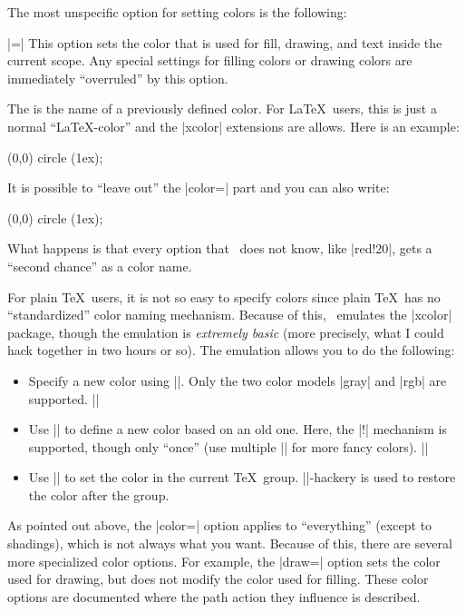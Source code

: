 The most unspecific option for setting colors is the following:

\begin{itemize}
  |=|%
  This option sets the color that is used for fill, drawing, and text
  inside the current scope. Any special settings for filling colors or
  drawing colors are immediately ``overruled'' by this option.

  The  is the name of a previously defined color. For
  \LaTeX\ users, this is just a normal ``\LaTeX-color'' and the
  |xcolor| extensions are allows. Here is an example:

\begin{codeexample}[]
\tikz \fill[color=red!20] (0,0) circle (1ex);
\end{codeexample}

  It is possible to ``leave out'' the |color=| part and you can also
  write:
\begin{codeexample}[]
\tikz \fill[red!20] (0,0) circle (1ex);
\end{codeexample}
  What happens is that every option that \tikzname\ does not know, like
  |red!20|, gets a ``second chance'' as a color name.

  For plain \TeX\ users, it is not so easy to specify colors since
  plain \TeX\ has no ``standardized'' color naming
  mechanism. Because of this, \pgfname\ emulates the |xcolor| package,
  though the emulation is \emph{extremely basic} (more precisely, what
  I could hack together in two hours or so). The emulation allows you
  to do the following:
  \begin{itemize}
  \item Specify a new color using |\definecolor|. Only the two color
    models |gray| and |rgb| are supported.
    \example ||
  \item Use || to define a new color based on an old
    one. Here, the |!| mechanism is supported, though only ``once''
    (use multiple || for more fancy colors).
    \example ||
  \item Use |\color| to set the color in the current
    \TeX\ group. |\aftergroup|-hackery is used to restore the color
    after the group.
  \end{itemize}
\end{itemize}

As pointed out above, the |color=| option applies to ``everything''
(except to shadings), which is not always what you want. Because of
this, there are several more specialized color options. For example,
the |draw=| option sets the color used for drawing, but does not
modify the color used for filling. These color options are documented
where the path action they influence is described.


